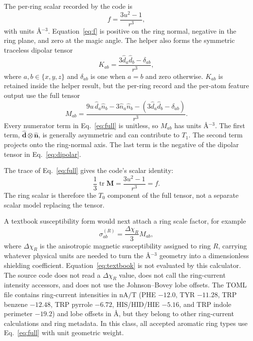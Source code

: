 \documentclass[11pt]{article}
\begin{document}
The per-ring scalar recorded by the code is
\begin{equation}
  f = \frac{3u^2-1}{r^3},
  \label{eq:f}
\end{equation}
with units \(\si{\angstrom^{-3}}\). Equation~\eqref{eq:f} is positive on the
ring normal, negative in the ring plane, and zero at the magic angle. The helper
also forms the symmetric traceless dipolar tensor
\begin{equation}
  K_{ab} =
  \frac{3\hat d_a\hat d_b-\delta_{ab}}{r^3},
  \label{eq:dipolar}
\end{equation}
where \(a,b\in\{x,y,z\}\) and \(\delta_{ab}\) is one when \(a=b\) and zero
otherwise. \(K_{ab}\) is retained inside the helper result, but the per-ring
record and the per-atom feature output use the full tensor
\begin{equation}
  M_{ab} =
  \frac{
    9u\,\hat d_a\hat n_b
    -3\hat n_a\hat n_b
    -\left(3\hat d_a\hat d_b-\delta_{ab}\right)}
  {r^3}.
  \label{eq:full}
\end{equation}
Every numerator term in Eq.~\eqref{eq:full} is unitless, so \(M_{ab}\) has
units \(\si{\angstrom^{-3}}\). The first term, \(\hat{\bm d}\otimes\hat{\bm n}\),
is generally asymmetric and can contribute to \(T_1\). The second term projects
onto the ring-normal axis. The last term is the negative of the dipolar tensor
in Eq.~\eqref{eq:dipolar}.

The trace of Eq.~\eqref{eq:full} gives the code's scalar identity:
\begin{equation}
  \frac{1}{3}\operatorname{tr}\bm M
  = \frac{3u^2-1}{r^3}
  = f .
  \label{eq:t0-is-f}
\end{equation}
The ring scalar is therefore the \(T_0\) component of the full tensor, not a
separate scalar model replacing the tensor.

A textbook susceptibility form would next attach a ring scale factor, for
example
\begin{equation}
  \sigma^{(R)}_{ab} =
  \frac{\Delta\chi_R}{3} M_{ab},
  \label{eq:textbook}
\end{equation}
where \(\Delta\chi_R\) is the anisotropic magnetic susceptibility assigned to
ring \(R\), carrying whatever physical units are needed to turn the
\(\si{\angstrom^{-3}}\) geometry into a dimensionless shielding coefficient.
Equation~\eqref{eq:textbook} is not evaluated by this calculator. The source
code does not read a \(\Delta\chi_R\) value, does not call the ring-current
intensity accessors, and does not use the Johnson--Bovey lobe offsets. The TOML
file contains ring-current intensities in \(\si{\nano\ampere\per\tesla}\)
(PHE \(-12.0\), TYR \(-11.28\), TRP benzene \(-12.48\), TRP pyrrole \(-6.72\),
HIS/HID/HIE \(-5.16\), and TRP indole perimeter \(-19.2\)) and lobe offsets in
\(\si{\angstrom}\), but they belong to other ring-current calculations and ring
metadata. In this class, all accepted aromatic ring types use Eq.~\eqref{eq:full}
with unit geometric weight.
\end{document}

